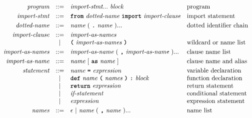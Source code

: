 \[\begin{array}{rcll}
\textit{program}         & ::= & \textit{import-stmt} ... \ \textit{block}                                               & \text{program}                          \\[1mm]
\textit{import-stmt}     & ::= & \term{from}\ \textit{dotted-name}\ \term{import}\ \textit{import-clause}                & \text{import statement}                 \\[1mm]
\textit{dotted-name}     & ::= & \textit{name}\ (\ \term{.}\ \textit{name}\ )...                                         & \text{dotted identifier chain}          \\[1mm]
\textit{import-clause}   & ::= & \textit{import-as-names}                                                                &                                         \\
                         & |   & \term{(}\ \textit{import-as-names}\ \term{)}                                            & \text{wildcard or name list}            \\[1mm]
\textit{import-as-names} & ::= & \textit{import-as-name}\ (\ \term{,}\ \textit{import-as-name}\ )...                     & \text{clause name list}                 \\[1mm]
\textit{import-as-name}  & ::= & \textit{name}\ [\ \term{as}\ \textit{name}\ ]                                           & \text{clause name and alias}            \\[1mm]
\textit{statement}       & ::= & \textit{name}\ \term{=}\ \textit{expression}                                            & \text{variable declaration}             \\
                         & |   & \term{def}\ \textit{name}\ \term{(}\ \textit{names}\ \term{)}\ \term{:}\ \textit{block} & \text{function declaration}             \\
                         & |   & \term{return}\ \textit{expression}                                                      & \text{return statement}                 \\
                         & |   & \textit{if-statement}                                                                   & \text{conditional statement}            \\
                         & |   & \textit{expression}                                                                     & \text{expression statement}             \\[1mm]
\textit{names}           & ::= & \epsilon\ |\ \textit{name}\ (\ \term{,}\ \textit{name}\ )...                            & \text{name list}                        \\[1mm]

\end{array}\]
